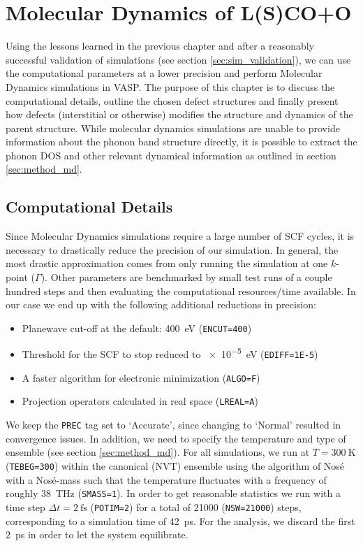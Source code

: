 \chapter{Molecular Dynamics of L(S)CO+O}\label{ch:md}
Using the lessons learned in the previous chapter and after a reasonably successful validation of simulations (see section \ref{sec:sim_validation}), we can use the computational parameters at a lower precision and perform Molecular Dynamics simulations in VASP. The purpose of this chapter is to discuss the computational details, outline the chosen defect structures and finally present how defects (interstitial or otherwise) modifies the structure and dynamics of the parent structure. While molecular dynamics simulations are unable to provide information about the phonon band structure directly, it is possible to extract the phonon DOS and other relevant dynamical information as outlined in section \ref{sec:method_md}.

\section{Computational Details}
Since Molecular Dynamics simulations require a large number of SCF cycles, it is necessary to drastically reduce the precision of our simulation. In general, the most drastic approximation comes from only running the simulation at one $k$-point ($\Gamma$). Other parameters are benchmarked by small test runs of a couple hundred steps and then evaluating the computational resources/time available. In our case we end up with the following additional reductions in precision:

\begin{itemize}
	\item Planewave cut-off at the default: \SI{400}{\eV} (\texttt{ENCUT=400})
	\item Threshold for the SCF to stop reduced to \SI{e-5}{\eV} (\texttt{EDIFF=1E-5})
	\item A faster algorithm for electronic minimization (\texttt{ALGO=F})
	\item Projection operators calculated in real space (\texttt{LREAL=A})
\end{itemize}

We keep the \texttt{PREC} tag set to `Accurate', since changing to `Normal' resulted in convergence issues. In addition, we need to specify the temperature and type of ensemble (see section \ref{sec:method_md}). For all simulations, we run at $T=\SI{300}{\kelvin}$ (\texttt{TEBEG=300}) within the canonical (NVT) ensemble using the algorithm of Nos\'{e} with a Nos\'{e}-mass such that the temperature fluctuates with a frequency of roughly \SI{38}{\tera\hertz} (\texttt{SMASS=1}). In order to get reasonable statistics we run with a time step $\Delta t = \SI{2}{\femto\second}$ (\texttt{POTIM=2}) for a total of 21000 (\texttt{NSW=21000}) steps, corresponding to a simulation time of \SI{42}{\pico\second}. For the analysis, we discard the first \SI{2}{\pico\second} in order to let the system equilibrate.

